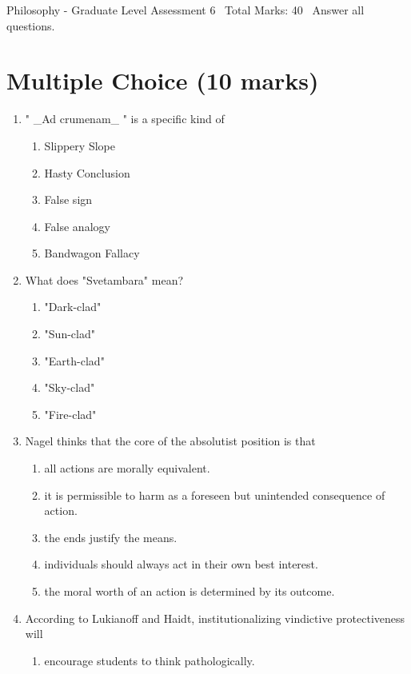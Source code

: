 \documentclass[12pt]{article}
\begin{document}
\begin{center}
Philosophy - Graduate Level Assessment 6 \
Total Marks: 40 \
Answer all questions.
\end{center}

\section*{Multiple Choice (10 marks)}
\begin{enumerate}[label=\arabic*.]
\item " \_Ad crumenam\_ " is a specific kind of
\begin{enumerate}[label=(\alph*)]
    \item Slippery Slope
    \item Hasty Conclusion
    \item False sign
    \item False analogy
    \item Bandwagon Fallacy
\end{enumerate}
\item What does "Svetambara" mean?
\begin{enumerate}[label=(\alph*)]
    \item "Dark-clad"
    \item "Sun-clad"
    \item "Earth-clad"
    \item "Sky-clad"
    \item "Fire-clad"
\end{enumerate}
\item Nagel thinks that the core of the absolutist position is that
\begin{enumerate}[label=(\alph*)]
    \item all actions are morally equivalent.
    \item it is permissible to harm as a foreseen but unintended consequence of action.
    \item the ends justify the means.
    \item individuals should always act in their own best interest.
    \item the moral worth of an action is determined by its outcome.
\end{enumerate}
\item According to Lukianoff and Haidt, institutionalizing vindictive protectiveness will
\begin{enumerate}[label=(\alph*)]
    \item encourage students to think pathologically.

\end{enumerate}
\end{enumerate}
\end{document}
